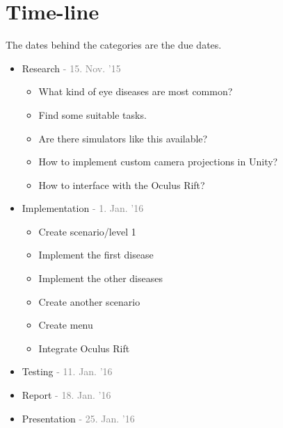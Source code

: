\documentclass{acm_proc_article-sp}
\newcommand{\Gray}[1]{\textcolor{Gray}{#1}}
\begin{document}
\section{Time-line}
The dates behind the categories are the due dates.
\begin{itemize}

  \item Research \Gray{- 15. Nov. '15}
  \begin{itemize}
    \item What kind of eye diseases are most common?
    \item Find some suitable tasks.
	\item Are there simulators like this available?
    \item How to implement custom camera projections in Unity?
    \item How to interface with the Oculus Rift?
  \end{itemize}

  \item Implementation \Gray{- 1. Jan. '16}
  \begin{itemize}
    \item Create scenario/level 1
    \item Implement the first disease
    \item Implement the other diseases 
    \item Create another scenario
    \item Create menu
    \item Integrate Oculus Rift
  \end{itemize}

  \item Testing \Gray{- 11. Jan. '16}
  \item Report \Gray{- 18. Jan. '16}
  \item Presentation \Gray{- 25. Jan. '16}

\end{itemize}
\end{document}
